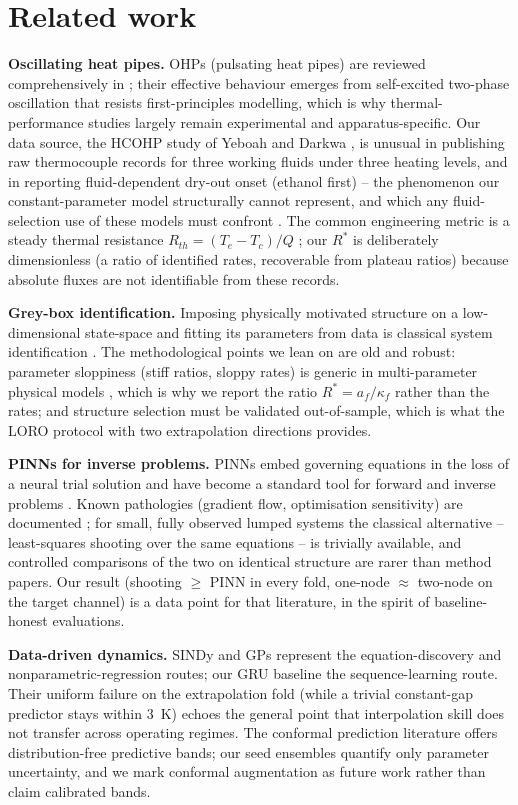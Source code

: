 \section{Related work}
\textbf{Oscillating heat pipes.} OHPs (pulsating heat pipes) are reviewed comprehensively in \cite{ma2015}; their
effective behaviour emerges from self-excited two-phase oscillation that resists first-principles modelling, which
is why thermal-performance studies largely remain experimental and apparatus-specific. Our data source, the HCOHP
study of Yeboah and Darkwa \cite{ijts,dataset,dib}, is unusual in publishing raw thermocouple records for three
working fluids under three heating levels, and in reporting fluid-dependent dry-out onset (ethanol first) --
the phenomenon our constant-parameter model structurally cannot represent, and which any fluid-selection use of
these models must confront \cite{li2019}. The common engineering metric is a steady thermal resistance
$R_{th} = (T_e - T_c)/Q$ \cite{li2019,ijts}; our $R^*$ is deliberately dimensionless (a ratio of identified rates,
recoverable from plateau ratios) because absolute fluxes are not identifiable from these records.

\textbf{Grey-box identification.} Imposing physically motivated structure on a low-dimensional state-space and
fitting its parameters from data is classical system identification \cite{ljung}. The methodological points we
lean on are old and robust: parameter sloppiness (stiff ratios, sloppy rates) is generic in multi-parameter
physical models \cite{gutenkunst}, which is why we report the ratio $R^*=a_f/\kappa_f$ rather than the rates; and
structure selection must be validated out-of-sample, which is what the LORO protocol with two extrapolation
directions provides.

\textbf{PINNs for inverse problems.} PINNs embed governing equations in the loss of a neural trial solution
\cite{raissi} and have become a standard tool for forward and inverse problems \cite{karniadakis}. Known
pathologies (gradient flow, optimisation sensitivity) are documented \cite{wang2021}; for small, fully observed
lumped systems the classical alternative -- least-squares shooting over the same equations -- is trivially
available, and controlled comparisons of the two on identical structure are rarer than method papers. Our result
(shooting $\ge$ PINN in every fold, one-node $\approx$ two-node on the target channel) is a data point for that
literature, in the spirit of baseline-honest evaluations.

\textbf{Data-driven dynamics.} SINDy \cite{brunton} and GPs \cite{gp} represent the equation-discovery and
nonparametric-regression routes; our GRU baseline the sequence-learning route. Their uniform failure on the
extrapolation fold (while a trivial constant-gap predictor stays within \SI{3}{\kelvin}) echoes the general point
that interpolation skill does not transfer across operating regimes. The conformal prediction literature
\cite{vovk} offers distribution-free predictive bands; our seed ensembles quantify only parameter uncertainty,
and we mark conformal augmentation as future work rather than claim calibrated bands.
